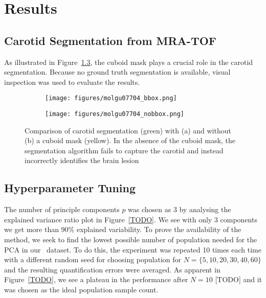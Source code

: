 \chapter{Results}
\section{Carotid Segmentation from MRA-TOF}
As illustrated in Figure~\ref{fig:seg_compare}, the cuboid mask plays a crucial role in the carotid segmentation.
Because no ground truth segmentation is available, visual inspection was used to evaluate the results.
\begin{figure}[h]
	\centering
	\begin{subfigure}{0.45\textwidth}
		\texttt{[image: figures/molgu07704\_bbox.png]}
		\caption{}
		\label{subfig:seg_bbox}
	\end{subfigure}
	\begin{subfigure}{0.45\textwidth}
		\texttt{[image: figures/molgu07704\_nobbox.png]}
		\caption{}
		\label{subfig:seg_nobbox}
	\end{subfigure}
	\caption{Comparison of carotid segmentation (green) with (a) and without (b) a cuboid mask (yellow). In the absence of the cuboid mask, the segmentation algorithm fails to capture the carotid and instead incorrectly identifies the brain lesion}
	\label{fig:seg_compare}
\end{figure}

\section{Hyperparameter Tuning}

The number of principle components $p$ was chosen as 3 by analysing the explained variance ratio plot in Figure~\ref{TODO}.
We see with only 3 components we get more than 90\% explained variability.
To prove the availability of the method, we seek to find the lowest possible number of population needed for the PCA in our \fdg $\,$ dataset.
To do this, the experiment was repeated 10 times each time with a different random seed for choosing population for $N=\{5,10,20,30,40,60\}$ and the resulting quantification errors were averaged.
As apparent in Figure~\ref{TODO}, we see a plateau in the performance after $N=10$ [TODO] and it was chosen as the ideal population sample count.

